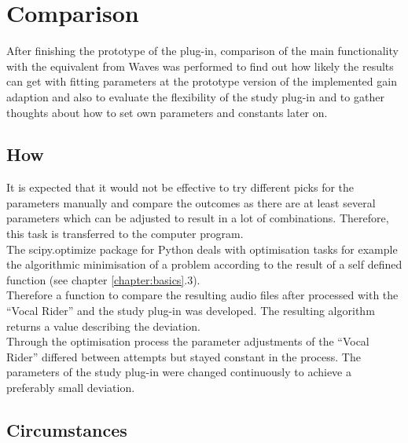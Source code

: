 \chapter{Comparison}
\label{chapter:comparison}

After finishing the prototype of the plug-in, comparison of the main functionality with the equivalent from Waves was performed to find out how likely the results can get with fitting parameters at the prototype version of the implemented gain adaption and also to evaluate the flexibility of the study plug-in and to gather thoughts about how to set own parameters and constants later on.\\

\section{How}

It is expected that it would not be effective to try different picks for the parameters manually and compare the outcomes as there are at least several parameters which can be adjusted to result in a lot of combinations. Therefore, this task is transferred to the computer program.\\
The scipy.optimize package for Python deals with optimisation tasks for example the algorithmic minimisation of a problem according to the result of a self defined function (see chapter \ref{chapter:basics}.3).\\
Therefore a function to compare the resulting audio files after processed with the “Vocal Rider” and the study plug-in was developed. The resulting algorithm returns a value describing the deviation.\\
Through the optimisation process the parameter adjustments of the “Vocal Rider” differed between attempts but stayed constant in the process. The parameters of the study plug-in were changed continuously to achieve a preferably small deviation.\\

\section{Circumstances}

